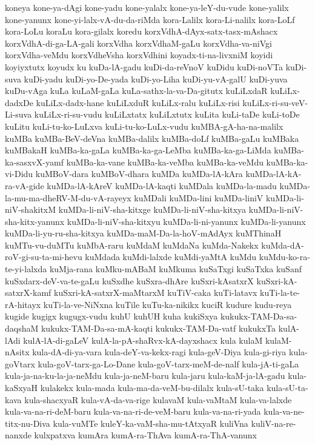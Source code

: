 {koneya
kone-ya-dAgi
kone-yadu
kone-yalalx
kone-ya-leY-du-vude
kone-yalilx
kone-yanunx
kone-yi-lalx-vA-du-da-riMda
kora-Lalilx
kora-Li-nalilx
kora-LoLf
kora-LoLu
koraLu
kora-gilalx
koredu
korxVdhA-dAyx-satx-tasx-mAshacx
korxVdhA-di-ga-LA-gali
korxVdha
korxVdhaM-gaLu
korxVdha-va-niVgi
korxVdha-veMdu
korxVdheVsha
korxVdhini
koyadx-ti-na-livxniM
koyidi
koyiyxtutx
koyudx
ku
kuDa-lA-gadu
kuDi-da-reVnoV
kuDidu
kuDi-noVTa
kuDi-suva
kuDi-yadu
kuDi-yo-De-yada
kuDi-yo-Liha
kuDi-yu-vA-galU
kuDi-yuva
kuDu-vAga
kuLa
kuLaM-gaLa
kuLa-sathx-la-va-Da-gitutx
kuLiLxdaR
kuLiLx-dadxDe
kuLiLx-dadx-hane
kuLiLxduR
kuLiLx-ralu
kuLiLx-risi
kuLiLx-ri-su-veV-Li-suva
kuLiLx-ri-su-vudu
kuLiLxtatx
kuLiLxtutx
kuLita
kuLi-taDe
kuLi-toDe
kuLitu
kuLi-tu-ko-LuLxva
kuLi-tu-ko-LuLx-vudu
kuMBA-gA-ha-na-malilx
kuMBa
kuMBa-BeV-deVna
kuMBa-dalilx
kuMBa-doLf
kuMBa-gaLu
kuMBaka
kuMBakaH
kuMBa-ka-gaLa
kuMBa-ka-ga-LeMba
kuMBa-ka-ga-LiMda
kuMBa-ka-sasxvX-yamf
kuMBa-ka-vane
kuMBa-ka-veMba
kuMBa-ka-veMdu
kuMBa-ka-vi-Didu
kuMBoV-dara
kuMBoV-dhara
kuMDa
kuMDa-lA-kAra
kuMDa-lA-kA-ra-vA-gide
kuMDa-lA-kAreV
kuMDa-lA-kaqti
kuMDala
kuMDa-la-madu
kuMDa-la-mu-ma-dheRV-M-du-vA-rayeyx
kuMDali
kuMDa-lini
kuMDa-liniV
kuMDa-li-niV-shakitxM
kuMDa-li-niV-sha-kitxge
kuMDa-li-niV-sha-kitxya
kuMDa-li-niV-sha-kitx-yanunx
kuMDa-li-niV-sha-kitxyu
kuMDa-li-ni-yanunx
kuMDa-li-yanunx
kuMDa-li-yu-ru-sha-kitxya
kuMDa-maM-Da-la-hoV-mAdAyx
kuMThinaH
kuMTu-vu-duMTu
kuMbA-raru
kuMdaM
kuMdaNa
kuMda-Nakekx
kuMda-dA-roV-gi-su-ta-mi-hevu
kuMdada
kuMdi-lalxde
kuMdi-yaMtA
kuMdu
kuMdu-ko-ra-te-yi-lalxda
kuMja-rana
kuMku-mABaM
kuMkuma
kuSaTxgi
kuSaTxka
kuSanf
kuSxdarx-deV-va-te-gaLu
kuSxdhe
kuSxra-dhAre
kuSxri-kAsatxrX
kuSxri-kA-satxrX-kamf
kuSxri-kA-satxrX-maMtarxM
kuTiV-caka
kuTi-latavx
kuTi-la-te-rA-hitayx
kuTi-la-ve-NiNxna
kuTile
kuTu-ka-nikikx
kuciR
kudure
kudu-reya
kugide
kugigx
kugugx-vudu
kuhU
kuhUH
kuha
kukiSxya
kukukx-TAM-Da-sa-daqshaM
kukukx-TAM-Da-sa-mA-kaqti
kukukx-TAM-Da-vatf
kukukxTa
kulA-lAdi
kulA-lA-di-gaLeV
kulA-la-pA-shaRvx-kA-dayxshacx
kula
kulaM
kulaM-nAsitx
kula-dA-di-ya-vara
kula-deY-va-kekx-ragi
kula-geV-Diya
kula-gi-riya
kula-goVtarx
kula-goV-tarx-ga-Lo-Dane
kula-goV-tarx-meM-de-nalf
kula-jA-ti-gaLa
kula-ja-na-ku-la-ja-neMdu
kula-ja-neM-baru
kula-jaru
kula-kaM-ja-lA-gadu
kula-kaSxyaH
kulakekx
kula-mada
kula-ma-da-veM-bu-dilalx
kula-sU-taka
kula-sU-ta-kava
kula-shacxyaR
kula-vA-da-va-rige
kulavaM
kula-vaMtaM
kula-va-lalxde
kula-va-na-ri-deM-baru
kula-va-na-ri-de-veM-baru
kula-va-na-ri-yada
kula-va-ne-titx-nu-Diva
kula-vuMTe
kuleY-ka-vaM-sha-mu-tAtxyaR
kuliVna
kuliV-na-re-nanxde
kulxpatxva
kumAra
kumA-ra-ThAva
kumA-ra-ThA-vanunx
}
